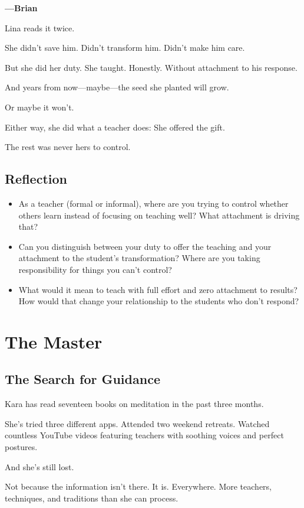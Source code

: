 \documentclass[11pt,twoside]{book}
\begin{document}
\textbf{—Brian}

Lina reads it twice.

She didn't save him. Didn't transform him. Didn't make him care.

But she did her duty. She taught. Honestly. Without attachment to his response.

And years from now—maybe—the seed she planted will grow.

Or maybe it won't.

Either way, she did what a teacher does: She offered the gift.

The rest was never hers to control.

\section*{Reflection}

\begin{itemize}
\item As a teacher (formal or informal), where are you trying to control whether others learn instead of focusing on teaching well? What attachment is driving that?
\item Can you distinguish between your duty to offer the teaching and your attachment to the student's transformation? Where are you taking responsibility for things you can't control?
\item What would it mean to teach with full effort and zero attachment to results? How would that change your relationship to the students who don't respond?
\end{itemize}

\chapter{The Master}

\section*{The Search for Guidance}

Kara has read seventeen books on meditation in the past three months.

She's tried three different apps. Attended two weekend retreats. Watched countless YouTube videos featuring teachers with soothing voices and perfect postures.

And she's still lost.

Not because the information isn't there. It is. Everywhere. More teachers, techniques, and traditions than she can process.
\end{document}
